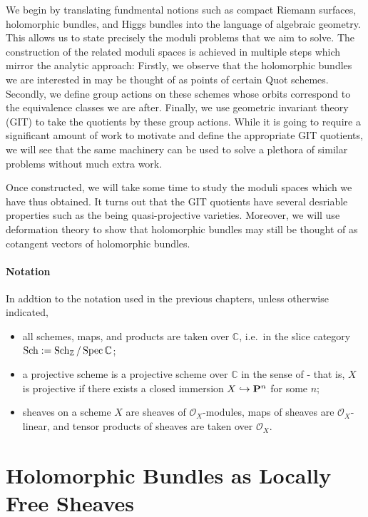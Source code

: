 \documentclass[12pt]{ociamthesis}  %
\begin{document}
We begin by translating fundmental notions such as compact
Riemann surfaces, holomorphic bundles, and Higgs bundles into
the language of algebraic geometry. This allows us to state
precisely the moduli problems that we aim to solve. The construction
of the related moduli spaces is achieved in multiple steps which
mirror the analytic approach: Firstly, we observe that the
holomorphic bundles we are interested in may be thought of as
points of certain Quot schemes. Secondly, we define group
actions on these schemes whose orbits correspond to the
equivalence classes we are after. Finally, we use geometric
invariant theory (GIT) to take the quotients by these group
actions. While it is going to require a significant amount of
work to motivate and define the appropriate GIT quotients,
we will see that the same machinery can be used to solve
a plethora of similar problems without much extra work.

Once constructed, we will take some time to study the moduli
spaces which we have thus obtained. It turns out that the GIT
quotients have several desriable properties such as the being
quasi-projective varieties. Moreover, we will use deformation
theory to show that holomorphic bundles may still be thought
of as cotangent vectors of holomorphic bundles.

\paragraph*{Notation}

In addtion to the notation used in the previous chapters, unless
otherwise indicated,
\begin{itemize}
  \item all schemes, maps, and products are taken over $\mathbb{C}$,
    i.e.~in the slice category
    $\operatorname{Sch} := \operatorname{Sch}_{\mathbb{Z}}/\operatorname{Spec}\mathbb{C}$;
  \item a projective scheme is a projective scheme over $\mathbb{C}$
    in the sense of \cite{hartshorne1977} - that is, $X$ is projective
    if there exists a closed immersion $X\hookrightarrow\mathbf{P}^{n}_{}$ for
    some $n$;
  \item sheaves on a scheme $X$ are sheaves of $\mathcal O_X$-modules,
    maps of sheaves are $\mathcal O_X$-linear, and tensor products
    of sheaves are taken over $\mathcal O_X$.
\end{itemize}

\section{Holomorphic Bundles as Locally Free Sheaves}
\end{document}
